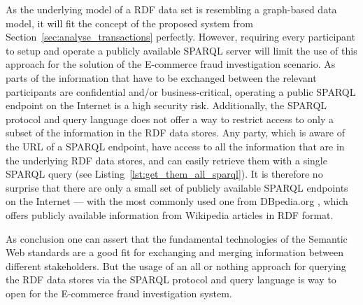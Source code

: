 As the underlying model of a \gls{RDF} data set is resembling a graph-based data model, it will fit the concept of the proposed system from Section~\ref{sec:analyse_transactions} perfectly. However, requiring every participant to setup and operate a publicly available \gls{SPARQL} server will limit the use of this approach for the solution of the \gls{E-commerce} fraud investigation scenario. As parts of the information that have to be exchanged between the relevant participants are confidential and/or business-critical, operating a public \gls{SPARQL} endpoint on the Internet is a high security risk. Additionally, the \gls{SPARQL} protocol and query language does not offer a way to restrict access to only a subset of the information in the \gls{RDF} data stores. Any party, which is aware of the \gls{URL} of a \gls{SPARQL} endpoint, have access to all the information that are in the underlying \gls{RDF} data stores, and can easily retrieve them with a single \gls{SPARQL} query (see Listing~\ref{lst:get_them_all_sparql}). It is therefore no surprise that there are only a small set of publicly available \gls{SPARQL} endpoints on the Internet --- with the most commonly used one from DBpedia.org \citep{dbPedia.org}, which offers publicly available information from Wikipedia articles in \gls{RDF} format. \\


As conclusion one can assert that the fundamental technologies of the Semantic Web standards are a good fit for exchanging and merging information between different stakeholders. But the usage of an all or nothing approach for querying the \gls{RDF} data stores via the \gls{SPARQL} protocol and query language is way to open for the \gls{E-commerce} fraud investigation system.


